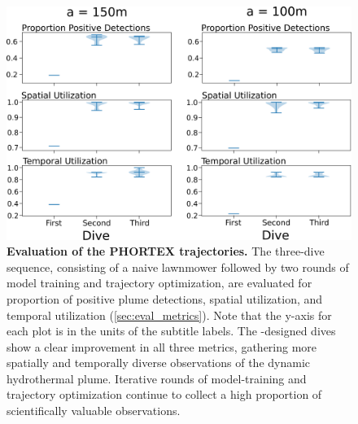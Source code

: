 \begin{figure}[h!]
    \centering
    \includegraphics[width=1\columnwidth]{figures/sim_traj_performance.png}
    \caption[Evaluation of the \PHORTEX trajectories.]{\textbf{Evaluation of the PHORTEX trajectories.} The three-dive sequence, consisting of a naive lawnmower followed by two rounds of \PHUMES model training and \PHORTEX trajectory optimization, are evaluated for proportion of positive plume detections, spatial utilization, and temporal utilization (\cref{sec:eval_metrics}). Note that the y-axis for each plot is in the units of the subtitle labels. The \PHORTEX-designed dives show a clear improvement in all three metrics, gathering more spatially and temporally diverse observations of the dynamic hydrothermal plume. Iterative rounds of \PHORTEX model-training and trajectory optimization continue to collect a high proportion of scientifically valuable observations.}
    \label{fig:sim_traj_perform}
\end{figure}


